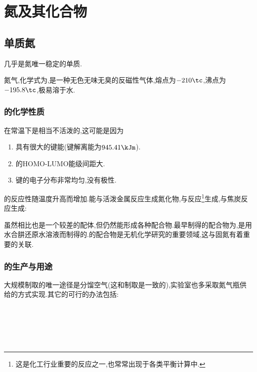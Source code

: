 \documentclass{ctexart}
\begin{document}
\section{氮及其化合物}
\subsection{单质氮}
几乎是氮唯一稳定的单质.
\begin{substance}[\ce{N2}]
    氮气,化学式为,是一种无色无味无臭的反磁性气体,熔点为$-210\tc$,沸点为$-195.8\tc$,极易溶于水.
\end{substance}
\subsubsection{的化学性质}
在常温下是相当不活泼的,这可能是因为
\begin{enumerate}[label=\tbf{\arabic*.},topsep=0pt,parsep=0pt,itemsep=0pt,partopsep=0pt]
    \item {}具有很大的键能(键解离能为$945.41\kJm$).
    \item {}的HOMO-LUMO能级间距大.
    \item {}键的电子分布非常均匀,没有极性.
\end{enumerate}
的反应性随温度升高而增加.能与活泼金属反应生成氮化物,与反应\footnote{这是化工行业重要的反应之一,也常常出现于各类平衡计算中.}生成,与焦炭反应生成:
\begin{center}
\end{center}
虽然相比也是一个较差的配体,但仍然能形成各种配合物.最早制得的配合物为,是用水合肼还原水溶液而制得的.的配合物是无机化学研究的重要领域,这与固氮有着重要的关联.
\subsubsection{的生产与用途}
大规模制取的唯一途径是分馏空气(这和制取是一致的),实验室也多采取氮气瓶供给的方式实现.其它的可行的办法包括:
\begin{center}
    \\
    \\
    \\
    \\
\end{center}
\end{document}
